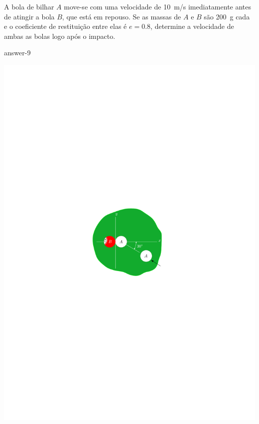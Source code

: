 \item A bola de bilhar $A$ move-se com uma velocidade de \SI{10}{\meter/\second} imediatamente antes de atingir a bola $B$, que está em repouso. Se as massas de $A$ e $B$ são \SI{200}{\gram} cada e o coeficiente de restituição entre elas é $e=0.8$, determine a velocidade de ambas as bolas logo após o impacto.

{answer-9}

\vspace{-2cm}
\begin{flushright}
	\includegraphics[scale=1.5]{images/draw_11}
\end{flushright}